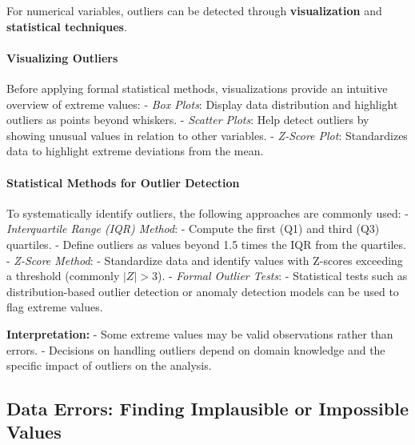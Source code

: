 \documentclass[12pt,openany]{book}
\begin{document}
For numerical variables, outliers can be detected through \textbf{visualization} 
and \textbf{statistical techniques}.
\newline

\paragraph{Visualizing Outliers}
Before applying formal statistical methods, visualizations provide an intuitive 
overview of extreme values:
\newline
- \textit{Box Plots}: Display data distribution and highlight outliers as 
  points beyond whiskers.
\newline
- \textit{Scatter Plots}: Help detect outliers by showing unusual values in 
  relation to other variables.
\newline
- \textit{Z-Score Plot}: Standardizes data to highlight extreme deviations 
  from the mean.
\newline

\paragraph{Statistical Methods for Outlier Detection}
To systematically identify outliers, the following approaches are commonly used:
\newline
- \textit{Interquartile Range (IQR) Method}:  
  - Compute the first (Q1) and third (Q3) quartiles.  
  - Define outliers as values beyond 1.5 times the IQR from the quartiles.  
\newline
- \textit{Z-Score Method}:  
  - Standardize data and identify values with Z-scores exceeding a threshold 
    (commonly \( |Z| > 3 \)).  
\newline
- \textit{Formal Outlier Tests}:  
  - Statistical tests such as distribution-based outlier detection or 
    anomaly detection models can be used to flag extreme values.
\newline

\textbf{Interpretation:}  
\newline
- Some extreme values may be valid observations rather than errors.  
- Decisions on handling outliers depend on domain knowledge and the specific 
  impact of outliers on the analysis.  
\newline


\subsection{Data Errors: Finding Implausible or Impossible Values}
\end{document}
